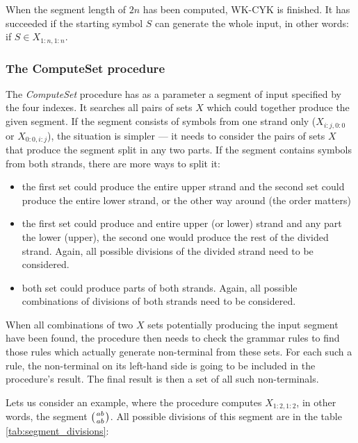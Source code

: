 When the segment length of $2n$ has been computed, WK-CYK is finished. It has succeeded if the starting symbol $S$ can generate the whole input, in other words: if $S \in X_{1:n,1:n}$.

\subsubsection{The ComputeSet procedure}
The \textit{ComputeSet} procedure has as a parameter a segment of input specified by the four indexes. It searches all pairs of sets $X$ which could together produce the given segment. If the segment consists of symbols from one strand only ($X_{i:j,0:0}$ or $X_{0:0,i:j}$), the situation is simpler --- it needs to consider the pairs of sets $X$ that produce the segment split in any two parts. If the segment contains symbols from both strands, there are more ways to split it:

\begin{itemize}
  \item{the first set could produce the entire upper strand and the second set could produce the entire lower strand, or the other way around (the order matters)}
  \item{the first set could produce and entire upper (or lower) strand and any part the lower (upper), the second one would produce the rest of the divided strand. Again, all possible divisions of the divided strand need to be considered.}
  \item{both set could produce parts of both strands. Again, all possible combinations of divisions of both strands need to be considered.}
\end{itemize}

When all combinations of two $X$ sets potentially producing the input segment have been found, the procedure then needs to check the grammar rules to find those rules which actually generate non-terminal from these sets. For each such a rule, the non-terminal on its left-hand side is going to be included in the procedure's result. The final result is then a set of all such non-terminals.

Lets us consider an example, where the procedure computes $X_{1:2,1:2}$, in other words, the segment $\wkpair{ab}{ab}$. All possible divisions of this segment are in the table \ref{tab:segment_divisions}:


